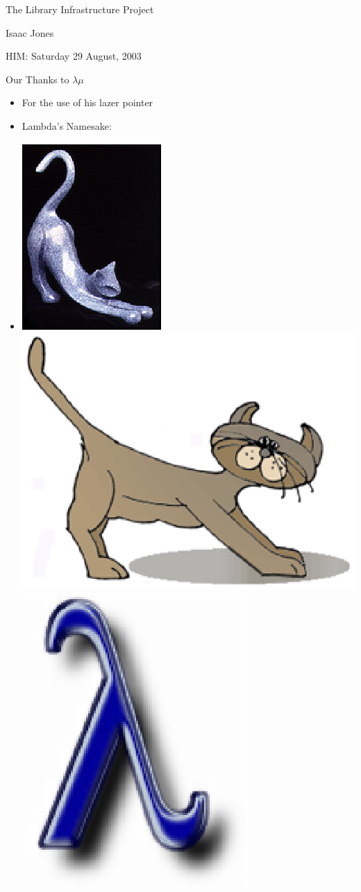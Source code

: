\documentclass[pdf,rico,slideColor,colorBG]{prosper}
\begin{document}
\begin{slide}{The Library Infrastructure Project}
\begin{center}Isaac Jones

HIM: Saturday 29 August, 2003\end{center}
\end{slide}

\begin{slide}{Our Thanks to $\lambda \mu$}
\begin{itemize}
\item For the use of his lazer pointer
\item Lambda's Namesake:
\item \includegraphics{stoneCat.eps}  \includegraphics[width=.4\textwidth]{cartoonCat.eps} \includegraphics[width=.2\textwidth]{lambda.eps}
\end{itemize}
\end{slide}
\end{document}
